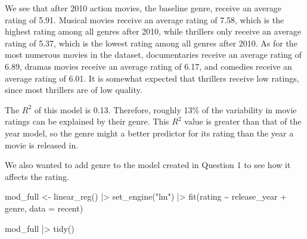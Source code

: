 \documentclass[
]{article}
\newenvironment{Shaded}{\begin{snugshade}}{\end{snugshade}}
\newcommand{\AttributeTok}[1]{\textcolor[rgb]{0.77,0.63,0.00}{#1}}
\newcommand{\FunctionTok}[1]{\textcolor[rgb]{0.00,0.00,0.00}{#1}}
\newcommand{\NormalTok}[1]{#1}
\newcommand{\OtherTok}[1]{\textcolor[rgb]{0.56,0.35,0.01}{#1}}
\newcommand{\SpecialCharTok}[1]{\textcolor[rgb]{0.00,0.00,0.00}{#1}}
\newcommand{\StringTok}[1]{\textcolor[rgb]{0.31,0.60,0.02}{#1}}
\begin{document}
We see that after 2010 action movies, the baseline genre, receive an
average rating of 5.91. Musical movies receive an average rating of
7.58, which is the highest rating among all genres after 2010, while
thrillers only receive an average rating of 5.37, which is the lowest
rating among all genres after 2010. As for the most numerous movies in
the dataset, documentaries receive an average rating of 6.89, dramas
movies receive an average rating of 6.17, and comedies receive an
average rating of 6.01. It is somewhat expected that thrillers receive
low ratings, since most thrillers are of low quality.

The \(R^2\) of this model is 0.13. Therefore, roughly 13\% of the
variability in movie ratings can be explained by their genre. This
\(R^2\) value is greater than that of the year model, so the genre might
a better predictor for its rating than the year a movie is released in.

We also wanted to add genre to the model created in Question 1 to see
how it affects the rating.

\begin{Shaded}
\begin{Highlighting}[]
\NormalTok{mod\_full }\OtherTok{\textless{}{-}} \FunctionTok{linear\_reg}\NormalTok{() }\SpecialCharTok{|\textgreater{}}
  \FunctionTok{set\_engine}\NormalTok{(}\StringTok{"lm"}\NormalTok{) }\SpecialCharTok{|\textgreater{}}
  \FunctionTok{fit}\NormalTok{(rating }\SpecialCharTok{\textasciitilde{}}\NormalTok{ release\_year }\SpecialCharTok{+}\NormalTok{ genre, }\AttributeTok{data =}\NormalTok{ recent)}

\NormalTok{mod\_full }\SpecialCharTok{|\textgreater{}}
  \FunctionTok{tidy}\NormalTok{()}
\end{Highlighting}
\end{Shaded}
\end{document}
